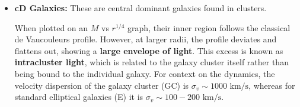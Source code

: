 \begin{itemize}
    \item \textbf{cD Galaxies:} These are central dominant galaxies found in clusters.
    
        \begin{minipage}{0.44\textwidth}
     When plotted on an $M$ vs $r^{1/4}$ graph, their inner region follows the classical de Vaucouleurs profile. However, at larger radii, the profile deviates and flattens out, showing a \textbf{large envelope of light}. This excess is known as \textbf{intracluster light}, which is related to the galaxy cluster itself rather than being bound to the individual galaxy. For context on the dynamics, the velocity dispersion of the galaxy cluster (GC) is $\sigma_v \sim 1000 \text{ km/s}$, whereas for standard elliptical galaxies (E) it is $\sigma_v \sim 100 - 200 \text{ km/s}$.
\end{minipage}
\hfill
\begin{minipage}{0.52\textwidth}
    \centering
\end{minipage}
\end{itemize}
